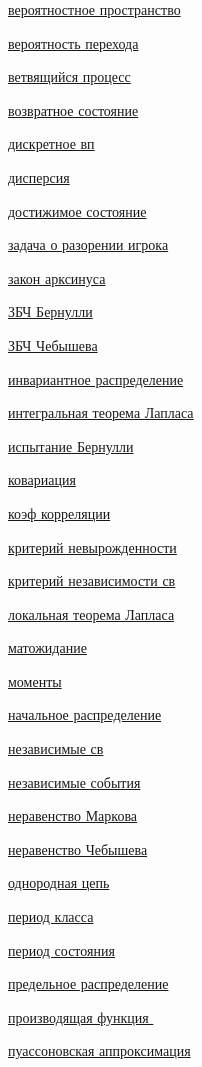 \documentclass[a4paper,100pt]{article}
\theoremstyle{indented}
\theoremstyle{definition}
\theoremstyle{remark}
\begin{document}
\begin{multicols}{2}

\hyperlink{n1}{вероятностное пространство} \ 

\hyperlink{n32}{вероятность перехода} \ 

\hyperlink{n27}{ветвящийся процесс} \ 

\hyperlink{n42}{возвратное состояние} \

\hyperlink{n2}{дискретное вп} \ 

\hyperlink{n14}{дисперсия} \ 

\hyperlink{n36}{достижимое состояние} \ 

\hyperlink{n44}{задача о разорении игрока} \

\hyperlink{n46}{закон арксинуса} \

\hyperlink{n22}{ЗБЧ Бернулли} \ 

\hyperlink{n21}{ЗБЧ Чебышева} \ 

\hyperlink{n33}{инвариантное распределение} \ 

\hyperlink{n25}{интегральная теорема Лапласа} \ 

\hyperlink{n12}{испытание Бернулли} \ 

\hyperlink{n19}{ковариация} \ 

\hyperlink{n20}{коэф корреляции} \ 

\hyperlink{n28}{критерий невырожденности} \ 

\hyperlink{n11}{критерий независимости св} \ 

\hyperlink{n24}{локальная теорема Лапласа} \ 

\hyperlink{n13}{матожидание} \ 

\hyperlink{n17}{моменты} \ 

\hyperlink{n31}{начальное распределение} \ 

\hyperlink{n10}{независимые св} \ 

\hyperlink{n7}{независимые события} \ 

\hyperlink{n15}{неравенство Маркова} \ 

\hyperlink{n16}{неравенство Чебышева} \ 

\hyperlink{n30}{однородная цепь} \ 

\hyperlink{n40}{период класса} \ 

\hyperlink{n39}{период состояния} \ 

\hyperlink{n34}{предельное распределение} \ 

\hyperlink{n26}{производящая функция } \ 

\hyperlink{n45}{пуассоновская аппроксимация} \ 


\end{multicols}
\end{document}
